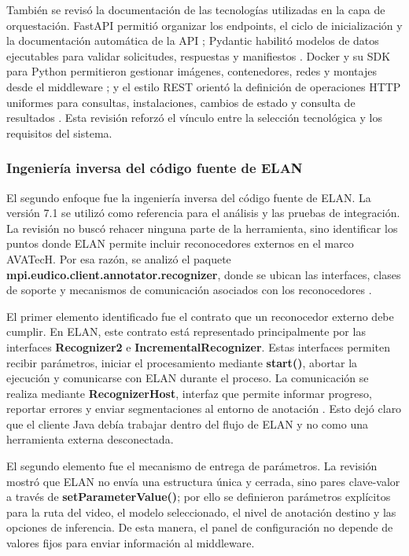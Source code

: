 \documentclass[11pt,a4paper]{article}
\begin{document}
También se revisó la documentación de las tecnologías utilizadas en la capa de orquestación. FastAPI permitió organizar los endpoints, el ciclo de inicialización y la documentación automática de la API \cite{fastapi2026features}; Pydantic habilitó modelos de datos ejecutables para validar solicitudes, respuestas y manifiestos \cite{pydantic2026models}. Docker y su SDK para Python permitieron gestionar imágenes, contenedores, redes y montajes desde el middleware \cite{docker2026overview,docker_sdk_python}; y el estilo REST orientó la definición de operaciones HTTP uniformes para consultas, instalaciones, cambios de estado y consulta de resultados \cite{fielding2000rest}. Esta revisión reforzó el vínculo entre la selección tecnológica y los requisitos del sistema.

\subsubsection{Ingeniería inversa del código fuente de ELAN}

El segundo enfoque fue la ingeniería inversa del código fuente de ELAN. La versión 7.1 se utilizó como referencia para el análisis y las pruebas de integración. La revisión no buscó rehacer ninguna parte de la herramienta, sino identificar los puntos donde ELAN permite incluir reconocedores externos en el marco AVATecH. Por esa razón, se analizó el paquete \textbf{mpi.eudico.client.annotator.recognizer}, donde se ubican las interfaces, clases de soporte y mecanismos de comunicación asociados con los reconocedores \cite{auer2010elan,auer2014avatech}.

El primer elemento identificado fue el contrato que un reconocedor externo debe cumplir. En ELAN, este contrato está representado principalmente por las interfaces \textbf{Recognizer2} e \textbf{IncrementalRecognizer}. Estas interfaces permiten recibir parámetros, iniciar el procesamiento mediante \textbf{start()}, abortar la ejecución y comunicarse con ELAN durante el proceso. La comunicación se realiza mediante \textbf{RecognizerHost}, interfaz que permite informar progreso, reportar errores y enviar segmentaciones al entorno de anotación \cite{auer2014avatech}. Esto dejó claro que el cliente Java debía trabajar dentro del flujo de ELAN y no como una herramienta externa desconectada.

El segundo elemento fue el mecanismo de entrega de parámetros. La revisión mostró que ELAN no envía una estructura única y cerrada, sino pares clave-valor a través de \textbf{setParameterValue()}; por ello se definieron parámetros explícitos para la ruta del video, el modelo seleccionado, el nivel de anotación destino y las opciones de inferencia. De esta manera, el panel de configuración no depende de valores fijos para enviar información al middleware.
\end{document}
